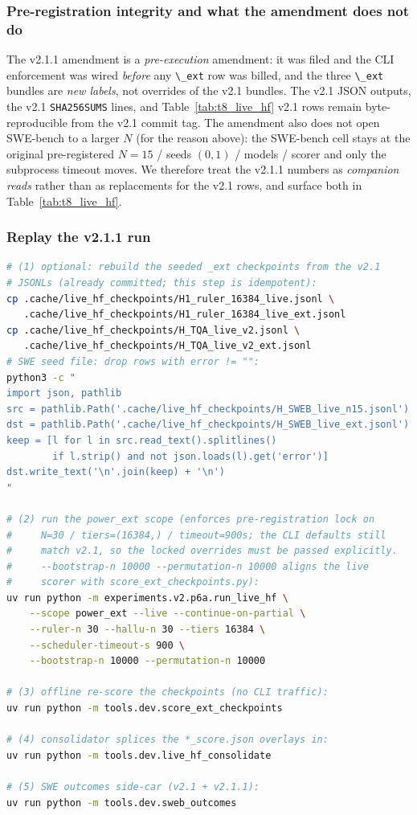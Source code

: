 \subsubsection{Pre-registration integrity and what the amendment
does not do}

The v2.1.1 amendment is a \emph{pre-execution} amendment: it was
filed and the CLI enforcement was wired \emph{before} any
\passthrough{\lstinline!\_ext!} row was billed, and the three
\passthrough{\lstinline!\_ext!} bundles are \emph{new labels},
not overrides of the v2.1 bundles. The v2.1 JSON outputs, the v2.1
\passthrough{\lstinline!SHA256SUMS!} lines, and Table~\ref{tab:t8_live_hf}
v2.1 rows remain byte-reproducible from the v2.1 commit tag. The
amendment also does not open SWE-bench to a larger $N$ (for the
reason above): the SWE-bench cell stays at the original
pre-registered $N=15$ / seeds $(0,1)$ / models / scorer and only
the subprocess timeout moves. We therefore treat the v2.1.1
numbers as \emph{companion reads} rather than as replacements
for the v2.1 rows, and surface both in Table~\ref{tab:t8_live_hf}.

\subsubsection{Replay the v2.1.1 run}

\begin{lstlisting}[language=bash]
# (1) optional: rebuild the seeded _ext checkpoints from the v2.1
# JSONLs (already committed; this step is idempotent):
cp .cache/live_hf_checkpoints/H1_ruler_16384_live.jsonl \
   .cache/live_hf_checkpoints/H1_ruler_16384_live_ext.jsonl
cp .cache/live_hf_checkpoints/H_TQA_live_v2.jsonl \
   .cache/live_hf_checkpoints/H_TQA_live_v2_ext.jsonl
# SWE seed file: drop rows with error != "":
python3 -c "
import json, pathlib
src = pathlib.Path('.cache/live_hf_checkpoints/H_SWEB_live_n15.jsonl')
dst = pathlib.Path('.cache/live_hf_checkpoints/H_SWEB_live_ext.jsonl')
keep = [l for l in src.read_text().splitlines()
        if l.strip() and not json.loads(l).get('error')]
dst.write_text('\n'.join(keep) + '\n')
"

# (2) run the power_ext scope (enforces pre-registration lock on
#     N=30 / tiers=(16384,) / timeout=900s; the CLI defaults still
#     match v2.1, so the locked overrides must be passed explicitly.
#     --bootstrap-n 10000 --permutation-n 10000 aligns the live
#     scorer with score_ext_checkpoints.py):
uv run python -m experiments.v2.p6a.run_live_hf \
    --scope power_ext --live --continue-on-partial \
    --ruler-n 30 --hallu-n 30 --tiers 16384 \
    --scheduler-timeout-s 900 \
    --bootstrap-n 10000 --permutation-n 10000

# (3) offline re-score the checkpoints (no CLI traffic):
uv run python -m tools.dev.score_ext_checkpoints

# (4) consolidator splices the *_score.json overlays in:
uv run python -m tools.dev.live_hf_consolidate

# (5) SWE outcomes side-car (v2.1 + v2.1.1):
uv run python -m tools.dev.sweb_outcomes
\end{lstlisting}

